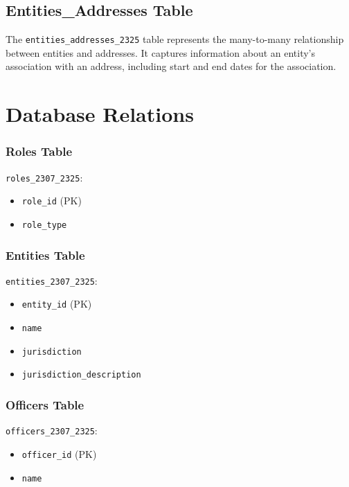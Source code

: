 \documentclass{article}
\begin{document}
\subsection*{Entities\_Addresses Table}
The \texttt{entities\_addresses\_2325} table represents the many-to-many relationship between entities and addresses. It captures information about an entity's association with an address, including start and end dates for the association.


\section*{\centering Database Relations}


\begin{minipage}{0.5\textwidth}

    \subsubsection*{Roles Table}
    \texttt{roles\_2307\_2325}:
    \begin{itemize}
        \item \texttt{role\_id} (PK)
        \item \texttt{role\_type}
    \end{itemize}

    \subsubsection*{Entities Table}
    \texttt{entities\_2307\_2325}:
    \begin{itemize}
        \item \texttt{entity\_id} (PK)
        \item \texttt{name}
        \item \texttt{jurisdiction}
        \item \texttt{jurisdiction\_description}
    \end{itemize}

    \subsubsection*{Officers Table}
    \texttt{officers\_2307\_2325}:
    \begin{itemize}
        \item \texttt{officer\_id} (PK)
        \item \texttt{name}
    \end{itemize}


\end{minipage}
\end{document}
